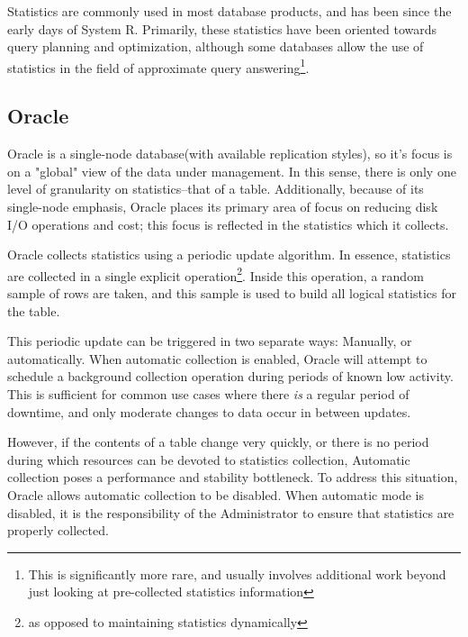 Statistics are commonly used in most database products, and has been since the early days of System R. Primarily, these statistics have been oriented towards query planning and optimization, although some databases allow the use of statistics in the field of approximate query answering\footnote{This is significantly more rare, and usually involves additional work beyond just looking at pre-collected statistics information}.

\subsection{Oracle}
Oracle is a single-node database(with available replication styles), so it's focus is on a "global" view of the data under management. In this sense, there is only one level of granularity on statistics--that of a table.  Additionally, because of its single-node emphasis, Oracle places its primary area of focus on reducing disk I/O operations and cost; this focus is reflected in the statistics which it collects.

Oracle collects statistics using a periodic update algorithm. In essence, statistics are collected in a single explicit operation\footnote{as opposed to maintaining statistics dynamically}. Inside this operation, a random sample of rows are taken, and this sample is used to build all logical statistics for the table.  

This periodic update can be triggered in two separate ways: Manually, or automatically. When automatic collection is enabled, Oracle will attempt to schedule a background collection operation during periods of known low activity. This is sufficient for common use cases where there \emph{is} a regular period of downtime, and only moderate changes to data occur in between updates. 

However, if the contents of a table change very quickly, or there is no period during which resources can be devoted to statistics collection, Automatic collection poses a performance and stability bottleneck. To address this situation, Oracle allows automatic collection to be disabled. When automatic mode is disabled, it is the responsibility of the Administrator to ensure that statistics are properly collected.

